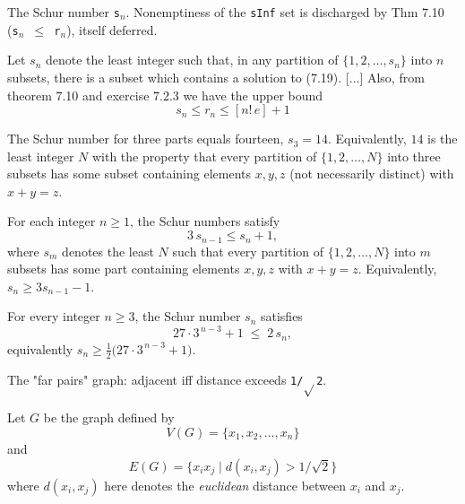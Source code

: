 \begin{definition}
\label{SimpleGraph.schurNumber}
\leanok
The Schur number \texttt{s$_{n}$}. Nonemptiness of the \texttt{sInf} set is discharged
by Thm 7.10 (\texttt{s$_{n}$ $\le$ r$_{n}$}), itself deferred.

Let $s_n$ denote the least integer such that, in any partition of
$\{1,2,\ldots,s_n\}$ into $n$ subsets, there is a subset which contains a
solution to (7.19). [...] Also, from theorem 7.10 and exercise 7.2.3 we have the
upper bound
\[s_n\le r_n\le[n!\,e]+1\]
\end{definition}

\begin{theorem}
\label{SimpleGraph.schurNumber_three}
The Schur number for three parts equals fourteen, $s_3 = 14$. Equivalently, $14$ is the
least integer $N$ with the property that every partition of $\{1,2,\ldots,N\}$ into
three subsets has some subset containing elements $x,y,z$ (not necessarily distinct)
with $x+y=z$.
\end{theorem}

\begin{theorem}
\label{SimpleGraph.schurNumber_recursion}
For each integer $n \ge 1$, the Schur numbers satisfy
\[
3\,s_{n-1} \le s_n + 1,
\]
where $s_m$ denotes the least $N$ such that every partition of $\{1, 2, \ldots, N\}$
into $m$ subsets has some part containing elements $x, y, z$ with $x + y = z$.
Equivalently, $s_n \ge 3 s_{n-1} - 1$.
\end{theorem}

\begin{theorem}
\label{SimpleGraph.schurNumber_lower_bound}
For every integer $n \ge 3$, the Schur number $s_n$ satisfies
\[27\cdot 3^{\,n-3} + 1 \;\le\; 2\,s_n,\]
equivalently $s_n \ge \tfrac{1}{2}\bigl(27\cdot 3^{\,n-3} + 1\bigr)$.
\end{theorem}

\begin{definition}
\label{SimpleGraph.farGraph}
\leanok
The "far pairs" graph: adjacent iff distance exceeds \texttt{1/$\sqrt{}$2}.

Let $G$ be the graph defined by
\[V(G) = \{x_1, x_2, \ldots, x_n\}\]
and
\[E(G) = \{x_i x_j \mid d(x_i, x_j) > 1/\sqrt{2}\}\]
where $d(x_i, x_j)$ here denotes the \emph{euclidean} distance between $x_i$ and
$x_j$.
\end{definition}

